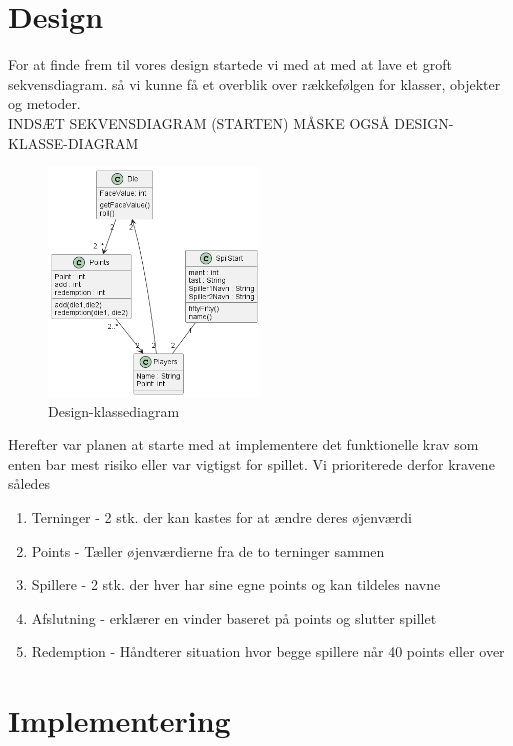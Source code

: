 \documentclass{article}
\begin{document}
\section{Design}
For at finde frem til vores design startede vi med at med at lave et groft sekvensdiagram. så vi kunne få et overblik over rækkefølgen for klasser, objekter og metoder.\\
INDSÆT SEKVENSDIAGRAM (STARTEN) MÅSKE OGSÅ DESIGN-KLASSE-DIAGRAM\\

\begin{figure}[h]
    \centering
    \includegraphics[width = 0.5\textwidth]{Billeder/ClassDiagram.png}
    \caption{Design-klassediagram}
    \label{fig:Design-klassediagram}
\end{figure}

Herefter var planen at starte med at implementere det funktionelle krav som enten bar mest risiko eller var vigtigst for spillet. Vi prioriterede derfor kravene således

\begin{enumerate}
\itemsep-0.4em
    \item Terninger - 2 stk. der kan kastes for at ændre deres øjenværdi
    \item Points - Tæller øjenværdierne fra de to terninger sammen
    \item Spillere - 2 stk. der hver har sine egne points og kan tildeles navne
    \item Afslutning - erklærer en vinder baseret på points og slutter spillet
    \item Redemption - Håndterer situation hvor begge spillere når 40 points eller over
\end{enumerate}


\section{Implementering}
\end{document}
